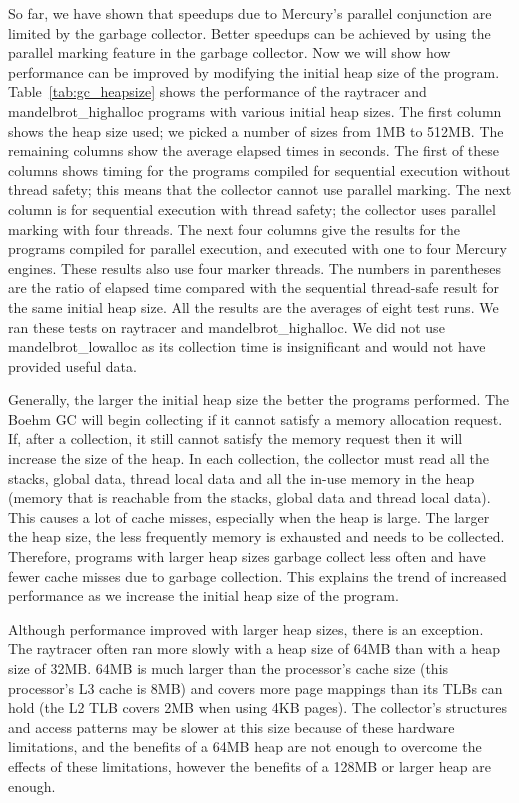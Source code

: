 

So far,
we have shown that speedups due to Mercury's parallel conjunction
are limited by the garbage collector.
Better speedups can be achieved by using the parallel marking feature in the
garbage collector.
Now we will show how performance can be improved by modifying the initial
heap size of the program.
Table~\ref{tab:gc_heapsize} shows the performance of the raytracer and
mandelbrot\_highalloc programs with various initial heap sizes.
The first column shows the heap size used;
we picked a number of sizes from 1MB to 512MB.
The remaining columns show the average elapsed times in seconds.
The first of these columns shows timing for the programs compiled for
sequential execution without thread safety;
this means that the collector cannot use parallel marking.
The next column is for sequential execution with thread safety;
the collector uses parallel marking with four threads.
The next four columns give the results for the programs compiled for
parallel execution, and executed with one to four Mercury engines.
These results also use four marker threads.
The numbers in parentheses are the ratio of elapsed time compared with the
sequential thread-safe result for the same initial heap size.
All the results are the averages of eight test runs.
We ran these tests on raytracer and mandelbrot\_highalloc.
We did not use mandelbrot\_lowalloc as its collection time is insignificant
and would not have provided useful data.

Generally, the larger the initial heap size the better the programs
performed.
The Boehm GC will begin collecting if it cannot satisfy a memory allocation
request.
If, after a collection, it still cannot satisfy the memory request then it
will increase the size of the heap.
In each collection,
the collector must read all the stacks, global data, thread local data and
all the in-use memory in the heap
(memory that is reachable from the stacks, global data and thread local
data).
This causes a lot of cache misses, especially when the heap is large.
The larger the heap size,
the less frequently memory is exhausted and needs to be collected.
Therefore,
programs with larger heap sizes garbage collect less often and
have fewer cache misses due to garbage collection.
This explains the trend of increased performance as we increase the initial
heap size of the program.

Although performance improved with larger heap sizes,
there is an exception.
The raytracer often ran more slowly with a heap size of 64MB
than with a heap size of 32MB.
64MB is much larger than the processor's cache size
(this processor's L3 cache is 8MB) and
covers more page mappings than its TLBs can hold
(the L2 TLB covers 2MB when using 4KB pages).
The collector's structures and access patterns may be slower at this size
because of these hardware limitations,
and the benefits of a 64MB heap are not enough to overcome the effects of
these limitations,
however the benefits of a 128MB or larger heap are enough.

